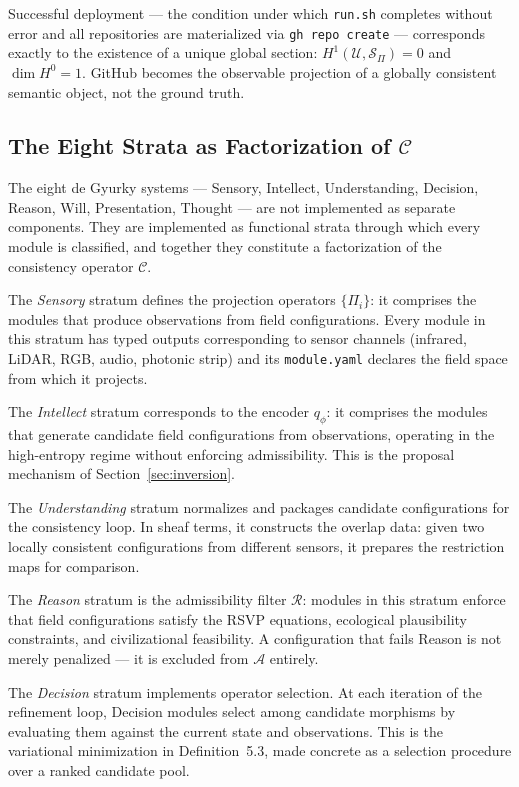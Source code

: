 \documentclass[12pt, oneside]{article}
\begin{document}
Successful deployment --- the condition under which \texttt{run.sh} completes without
error and all repositories are materialized via \texttt{gh repo create} --- corresponds
exactly to the existence of a unique global section: $H^1(\mathcal{U}, \mathcal{S}_\Pi)
= 0$ and $\dim H^0 = 1$. GitHub becomes the observable projection of a globally
consistent semantic object, not the ground truth.

\subsection{The Eight Strata as Factorization of $\mathcal{C}$}

The eight de Gyurky systems --- Sensory, Intellect, Understanding, Decision, Reason,
Will, Presentation, Thought --- are not implemented as separate components. They are
implemented as functional strata through which every module is classified, and together
they constitute a factorization of the consistency operator $\mathcal{C}$.

The \emph{Sensory} stratum defines the projection operators $\{\Pi_i\}$: it comprises
the modules that produce observations from field configurations. Every module in this
stratum has typed outputs corresponding to sensor channels (infrared, LiDAR, RGB, audio,
photonic strip) and its \texttt{module.yaml} declares the field space from which it
projects.

The \emph{Intellect} stratum corresponds to the encoder $q_\phi$: it comprises the
modules that generate candidate field configurations from observations, operating in the
high-entropy regime without enforcing admissibility. This is the proposal mechanism of
Section~\ref{sec:inversion}.

The \emph{Understanding} stratum normalizes and packages candidate configurations for
the consistency loop. In sheaf terms, it constructs the overlap data: given two locally
consistent configurations from different sensors, it prepares the restriction maps for
comparison.

The \emph{Reason} stratum is the admissibility filter $\mathcal{R}$: modules in this
stratum enforce that field configurations satisfy the RSVP equations, ecological
plausibility constraints, and civilizational feasibility. A configuration that fails
Reason is not merely penalized --- it is excluded from $\mathcal{A}$ entirely.

The \emph{Decision} stratum implements operator selection. At each iteration of the
refinement loop, Decision modules select among candidate morphisms by evaluating them
against the current state and observations. This is the variational minimization in
Definition~5.3, made concrete as a selection procedure over a ranked candidate pool.
\end{document}
